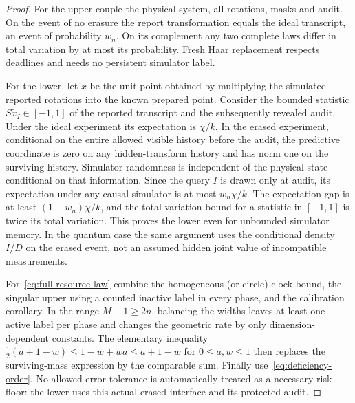 \begin{proof}
For the upper couple the physical system, all rotations, masks and audit. On the event of no erasure the report transformation equals the ideal transcript, an event of probability $w_n$. On its complement any two complete laws differ in total variation by at most its probability. Fresh Haar replacement respects deadlines and needs no persistent simulator label.

For the lower, let $\widetilde x$ be the unit point obtained by multiplying the simulated reported rotations into the known prepared point. Consider the bounded statistic $S\widetilde x_I\in[-1,1]$ of the reported transcript and the subsequently revealed audit. Under the ideal experiment its expectation is $\chi/k$. In the erased experiment, conditional on the entire allowed visible history before the audit, the predictive coordinate is zero on any hidden-transform history and has norm one on the surviving history. Simulator randomness is independent of the physical state conditional on that information. Since the query $I$ is drawn only at audit, its expectation under any causal simulator is at most $w_n\chi/k$. The expectation gap is at least $(1-w_n)\chi/k$, and the total-variation bound for a statistic in $[-1,1]$ is twice its total variation. This proves the lower even for unbounded simulator memory. In the quantum case the same argument uses the conditional density $I/D$ on the erased event, not an assumed hidden joint value of incompatible measurements.

For~\eqref{eq:full-resource-law} combine the homogeneous (or circle) clock bound, the singular upper using a counted inactive label in every phase, and the calibration corollary. In the range $M-1\ge2n$, balancing the widths leaves at least one active label per phase and changes the geometric rate by only dimension-dependent constants. The elementary inequality
$\tfrac12(a+1-w)\le 1-w+wa\le a+1-w$ for $0\le a,w\le1$ then replaces the surviving-mass expression by the comparable sum. Finally use~\eqref{eq:deficiency-order}. No allowed error tolerance is automatically treated as a necessary risk floor: the lower uses this actual erased interface and its protected audit.
\end{proof}
